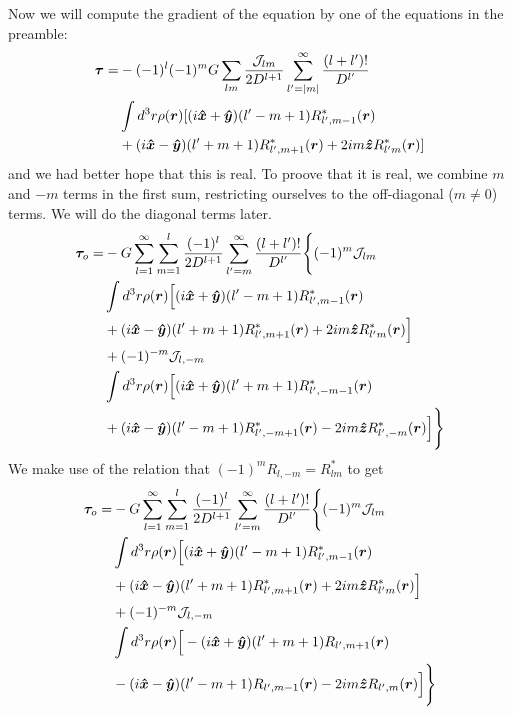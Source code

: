 \documentclass[aps,twocolumn,secnumarabic,balancelastpage,amsmath,amssymb,nofootinbib,floatfix]{revtex4-1}
\begin{document}
Now we will compute the gradient of the equation by one of the equations in the preamble:
\begin{equation*}
\begin{aligned}
\bm \tau = &-(-1)^l (-1)^m G\sum_{lm}  \frac{\mathcal{J}_{lm}}{2D^{l+1}}\sum_{l'=|m|}^\infty \frac{(l+l')!}{D^{l'}}\\
& \int d^3 r\rho(\bm r)[(i\bm{\hat x} + \bm{\hat y})(l'-m+1)R^*_{l',m-1}(\bm r)\\
&+(i\bm{\hat x}-\bm{\hat y})(l'+m+1)R^*_{l',m+1}(\bm r)+2im\bm{\hat z} R^*_{l'm}(\bm r)]
\end{aligned}
\end{equation*}
and we had better hope that this is real. To proove that it is real, we combine $m$ and $-m$ terms in the first sum, restricting ourselves to the off-diagonal ($m \neq 0$) terms. We will do the diagonal terms later.
\begin{equation*}
\begin{aligned}
\bm \tau_o = &-G\sum_{l=1}^\infty \sum_{m=1}^l \frac{(-1)^l}{2D^{l+1}}\sum_{l'=m}^\infty \frac{(l+l')!}{D^{l'}}\Bigg\{(-1)^m \mathcal{J}_{lm}\\
& \int d^3 r\rho(\bm r)\Big[(i\bm{\hat x} + \bm{\hat y})(l'-m+1)R^*_{l',m-1}(\bm r)\\
&+(i\bm{\hat x}-\bm{\hat y})(l'+m+1)R^*_{l',m+1}(\bm r)+2im\bm{\hat z} R^*_{l'm}(\bm r)\Big] \\
&+ (-1)^{-m} \mathcal{J}_{l,-m}\\
&\int d^3 r\rho(\bm r)\Big[(i\bm{\hat x} + \bm{\hat y})(l'+m+1)R^*_{l',-m-1}(\bm r)\\
&+(i\bm{\hat x}-\bm{\hat y})(l'-m+1)R^*_{l',-m+1}(\bm r)-2im\bm{\hat z} R^*_{l',-m}(\bm r)\Big]\Bigg\}
\end{aligned}
\end{equation*}
We make use of the relation that $(-1)^m R_{l,-m}=R^*_{lm}$ to get
\begin{equation*}
\begin{aligned}
\bm \tau_o = &-G\sum_{l=1}^\infty \sum_{m=1}^l \frac{(-1)^l}{2D^{l+1}}\sum_{l'=m}^\infty \frac{(l+l')!}{D^{l'}}\Bigg\{(-1)^m \mathcal{J}_{lm}\\
& \int d^3 r\rho(\bm r)\Big[(i\bm{\hat x} + \bm{\hat y})(l'-m+1)R^*_{l',m-1}(\bm r)\\
&+(i\bm{\hat x}-\bm{\hat y})(l'+m+1)R^*_{l',m+1}(\bm r)+2im\bm{\hat z} R^*_{l'm}(\bm r)\Big] \\
&+ (-1)^{-m} \mathcal{J}_{l,-m}\\
&\int d^3 r\rho(\bm r)\Big[-(i\bm{\hat x} + \bm{\hat y})(l'+m+1)R_{l',m+1}(\bm r)\\
&-(i\bm{\hat x}-\bm{\hat y})(l'-m+1)R_{l',m-1}(\bm r)-2im\bm{\hat z} R_{l',m}(\bm r)\Big]\Bigg\}
\end{aligned}
\end{equation*}
\end{document}
